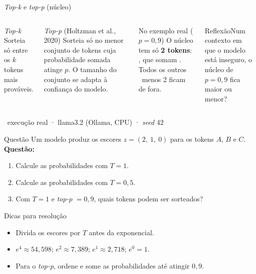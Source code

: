 \documentclass[aspectratio=169]{beamer}
\newcommand{\reflexao}[1]{\begin{alertblock}{Reflexão}#1\end{alertblock}}
\newcommand{\real}{\textcolor{minegreen}{\tiny\faIcon{flask}\ execução real · llama3.2 (Ollama, CPU) · \textit{seed} 42}}
\begin{document}
\begin{frame}{\textit{Top-k} e \textit{top-p} (núcleo)}
    \begin{columns}
        \begin{block}{\textit{Top-k}}
            \footnotesize Sorteia só entre os $k$ tokens mais prováveis.
        \end{block}
        \begin{block}{\textit{Top-p} (Holtzman et al., 2020)}
            \footnotesize Sorteia só no menor conjunto de tokens cuja probabilidade somada atinge $p$. O tamanho do conjunto se adapta à confiança do modelo.
        \end{block}
        \pause
        \begin{block}{No exemplo real ($p = 0{,}9$)}
            \footnotesize O núcleo tem só \textbf{2 tokens}: \vNUC, que somam \vNUCM. Todos os outros \vVOC\ menos 2 ficam de fora.
        \end{block}
        \reflexao{Num contexto em que o modelo está inseguro, o núcleo de $p = 0{,}9$ fica maior ou menor?}
    \end{columns}
    \real
\end{frame}

\begin{frame}{Questão}
    \footnotesize
    Um modelo produz os escores $z = (2,\ 1,\ 0)$ para os tokens $A$, $B$ e $C$.
    \textbf{Questão:}
    \begin{enumerate}
        \item Calcule as probabilidades com $T = 1$.
        \item Calcule as probabilidades com $T = 0{,}5$.
        \item Com $T = 1$ e \textit{top-p} $= 0{,}9$, quais tokens podem ser sorteados?
    \end{enumerate}
    \pause
    \begin{block}{Dicas para resolução}
        \begin{itemize}\footnotesize
            \item Divida os escores por $T$ antes da exponencial.
            \item $e^{4} \approx 54{,}598$; $e^{2} \approx 7{,}389$; $e^{1} \approx 2{,}718$; $e^{0} = 1$.
            \item Para o \textit{top-p}, ordene e some as probabilidades até atingir $0{,}9$.
        \end{itemize}
    \end{block}
\end{frame}
\end{document}
